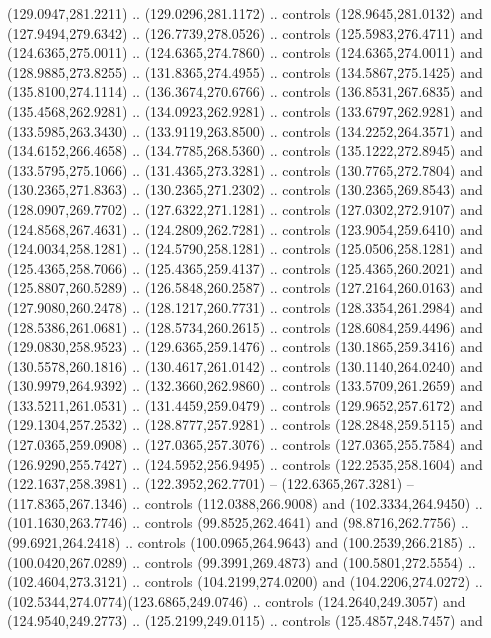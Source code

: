 \begin{scope}[cm={{1.25,0.0,0.0,-1.25,(0.0,743.43331)}}]
    (129.0947,281.2211) .. (129.0296,281.1172) .. controls (128.9645,281.0132) and
    (127.9494,279.6342) .. (126.7739,278.0526) .. controls (125.5983,276.4711) and
    (124.6365,275.0011) .. (124.6365,274.7860) .. controls (124.6365,274.0011) and
    (128.9885,273.8255) .. (131.8365,274.4955) .. controls (134.5867,275.1425) and
    (135.8100,274.1114) .. (136.3674,270.6766) .. controls (136.8531,267.6835) and
    (135.4568,262.9281) .. (134.0923,262.9281) .. controls (133.6797,262.9281) and
    (133.5985,263.3430) .. (133.9119,263.8500) .. controls (134.2252,264.3571) and
    (134.6152,266.4658) .. (134.7785,268.5360) .. controls (135.1222,272.8945) and
    (133.5795,275.1066) .. (131.4365,273.3281) .. controls (130.7765,272.7804) and
    (130.2365,271.8363) .. (130.2365,271.2302) .. controls (130.2365,269.8543) and
    (128.0907,269.7702) .. (127.6322,271.1281) .. controls (127.0302,272.9107) and
    (124.8568,267.4631) .. (124.2809,262.7281) .. controls (123.9054,259.6410) and
    (124.0034,258.1281) .. (124.5790,258.1281) .. controls (125.0506,258.1281) and
    (125.4365,258.7066) .. (125.4365,259.4137) .. controls (125.4365,260.2021) and
    (125.8807,260.5289) .. (126.5848,260.2587) .. controls (127.2164,260.0163) and
    (127.9080,260.2478) .. (128.1217,260.7731) .. controls (128.3354,261.2984) and
    (128.5386,261.0681) .. (128.5734,260.2615) .. controls (128.6084,259.4496) and
    (129.0830,258.9523) .. (129.6365,259.1476) .. controls (130.1865,259.3416) and
    (130.5578,260.1816) .. (130.4617,261.0142) .. controls (130.1140,264.0240) and
    (130.9979,264.9392) .. (132.3660,262.9860) .. controls (133.5709,261.2659) and
    (133.5211,261.0531) .. (131.4459,259.0479) .. controls (129.9652,257.6172) and
    (129.1304,257.2532) .. (128.8777,257.9281) .. controls (128.2848,259.5115) and
    (127.0365,259.0908) .. (127.0365,257.3076) .. controls (127.0365,255.7584) and
    (126.9290,255.7427) .. (124.5952,256.9495) .. controls (122.2535,258.1604) and
    (122.1637,258.3981) .. (122.3952,262.7701) -- (122.6365,267.3281) --
    (117.8365,267.1346) .. controls (112.0388,266.9008) and (102.3334,264.9450) ..
    (101.1630,263.7746) .. controls (99.8525,262.4641) and (98.8716,262.7756) ..
    (99.6921,264.2418) .. controls (100.0965,264.9643) and (100.2539,266.2185) ..
    (100.0420,267.0289) .. controls (99.3991,269.4873) and (100.5801,272.5554) ..
    (102.4604,273.3121) .. controls (104.2199,274.0200) and (104.2206,274.0272) ..
    (102.5344,274.0774)(123.6865,249.0746) .. controls (124.2640,249.3057) and
    (124.9540,249.2773) .. (125.2199,249.0115) .. controls (125.4857,248.7457) and

\end{scope}
